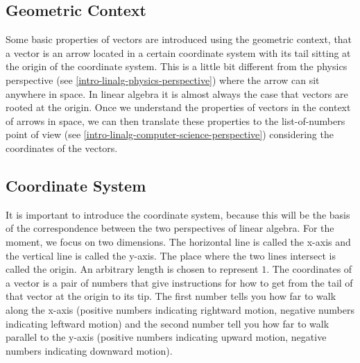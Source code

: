 \documentclass[
]{book}
\theoremstyle{definition}
\theoremstyle{definition}
\theoremstyle{definition}
\theoremstyle{remark}
\begin{document}
\hypertarget{intro-linalg-geometric-context}{%
\subsection{Geometric Context}\label{intro-linalg-geometric-context}}

Some basic properties of vectors are introduced using the geometric context, that a vector is an arrow located in a certain coordinate system with its tail sitting at the origin of the coordinate system. This is a little bit different from the physics perspective (see \ref{intro-linalg-physics-perspective}) where the arrow can sit anywhere in space. In linear algebra it is almost always the case that vectors are rooted at the origin. Once we understand the properties of vectors in the context of arrows in space, we can then translate these properties to the list-of-numbers point of view (see \ref{intro-linalg-computer-science-perspective}) considering the coordinates of the vectors.

\hypertarget{intro-linalg-coordinate-system}{%
\subsection{Coordinate System}\label{intro-linalg-coordinate-system}}

It is important to introduce the coordinate system, because this will be the basis of the correspondence between the two perspectives of linear algebra. For the moment, we focus on two dimensions. The horizontal line is called the x-axis and the vertical line is called the y-axis. The place where the two lines intersect is called the origin. An arbitrary length is chosen to represent \(1\). The coordinates of a vector is a pair of numbers that give instructions for how to get from the tail of that vector at the origin to its tip. The first number tells you how far to walk along the x-axis (positive numbers indicating rightward motion, negative numbers indicating leftward motion) and the second number tell you how far to walk parallel to the y-axis (positive numbers indicating upward motion, negative numbers indicating downward motion).
\end{document}
